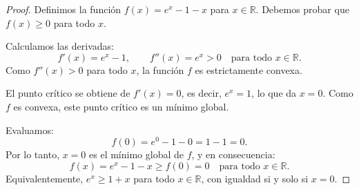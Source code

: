 \documentclass[11pt,a4paper]{article}
\theoremstyle{plain}
\theoremstyle{definition}
\begin{document}
\begin{proof}
Definimos la funci\'on $f(x) = e^x - 1 - x$ para $x \in \mathbb{R}$. Debemos probar que $f(x) \geq 0$ para todo $x$.

Calculamos las derivadas:
\[
f'(x) = e^x - 1, \qquad f''(x) = e^x > 0 \quad \text{para todo } x \in \mathbb{R}.
\]
Como $f''(x) > 0$ para todo $x$, la funci\'on $f$ es estrictamente convexa.

El punto cr\'itico se obtiene de $f'(x) = 0$, es decir, $e^x = 1$, lo que da $x = 0$. Como $f$ es convexa, este punto cr\'itico es un m\'inimo global.

Evaluamos:
\[
f(0) = e^0 - 1 - 0 = 1 - 1 = 0.
\]
Por lo tanto, $x = 0$ es el m\'inimo global de $f$, y en consecuencia:
\[
f(x) = e^x - 1 - x \geq f(0) = 0 \quad \text{para todo } x \in \mathbb{R}.
\]
Equivalentemente, $e^x \geq 1 + x$ para todo $x \in \mathbb{R}$, con igualdad si y solo si $x = 0$. \qedhere
\end{proof}
\end{document}
